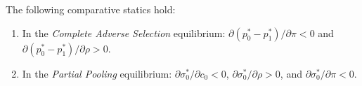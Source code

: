 \label{prop:comparative_statics}
The following comparative statics hold:
\begin{enumerate}[label=(\roman*)]
    \item In the \emph{Complete Adverse Selection} equilibrium: $\partial(p_0^*-p_1^*)/\partial\pi < 0$ and $\partial(p_0^*-p_1^*)/\partial\rho > 0$.
    \item In the \emph{Partial Pooling} equilibrium: $\partial\sigma_0^*/\partial c_0 < 0$, $\partial\sigma_0^*/\partial\rho > 0$, and $\partial\sigma_0^*/\partial\pi < 0$.
\end{enumerate}
